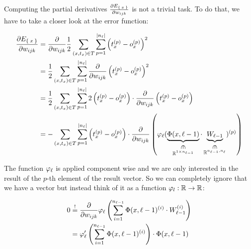 Computing the partial derivatives $\frac{\partial E_{\Set{x}}}{\partial w_{ijk}}$
is not a trivial task. To do that, we have to take a closer look at the
error function:

\begin{align}
    \frac{\partial E_{\Set{x}}}{\partial w_{ijk}}
    &= \frac{\partial}{\partial w_{ijk}} \frac{1}{2} \sum_{(x, t_x) \in T} \sum_{p = 1}^{|n_\layernumber|} \left (t_{x}^{(p)} - o_{x}^{(p)} \right )^2\\
    &= \frac{1}{2} \sum_{(x, t_x) \in T} \sum_{p = 1}^{|n_\layernumber|} \frac{\partial}{\partial w_{ijk}} \left (t_{x}^{(p)} - o_{x}^{(p)} \right )^2\\
    &= \frac{1}{2} \sum_{(x, t_x) \in T} \sum_{p = 1}^{|n_\layernumber|} 2 \left (t_{x}^{(p)} - o_{x}^{(p)} \right ) \cdot \frac{\partial}{\partial w_{ijk}} \left (t_{x}^{(p)} - o_{x}^{(p)} \right )\\
    &= - \sum_{(x, t_x) \in T} \sum_{p = 1}^{|n_\layernumber|} \left (t_{x}^{(p)} - o_{x}^{(p)} \right ) \cdot \frac{\partial}{\partial w_{ijk}}
    \left (
        \varphi_{\layernumber}(
            \underbrace{\Phi(x, \layernumber-1)}_{\stackrel{\vin}{\mdr^{1 \times n_{\layernumber-1}}}}
            \cdot 
            \underbrace{W_{\layernumber-1}}_{\stackrel{\vin}{\mdr^{n_{\layernumber-1}, n_\layernumber}}}
        )^{(p)}
    \right)
\end{align}

The function $\varphi_{{\ell}}$ is applied component wise and we are
only interested in the result of the $p$-th element of the result vector. So we
can completely ignore that we have a vector but instead think of it as a function
$\varphi_l: \mathbb{R} \rightarrow \mathbb{R}$:

\begin{align}
    0 &\stackrel{!}{=}
    \frac{\partial}{\partial w_{ijk}}
        \varphi_{\layernumber} \left (
            \sum_{i=1}^{n_{\layernumber-1}} \Phi(x, \layernumber-1)^{(i)}
            \cdot 
            W_{\layernumber-1}^{(i)}
        \right )
    \\
    &= \varphi_{\layernumber}' \left (
            \sum_{i=1}^{n_{\layernumber-1}} \Phi(x, \layernumber-1)^{(i)}
       \right )
       \cdot
       \Phi(x, \layernumber - 1) %
\end{align}